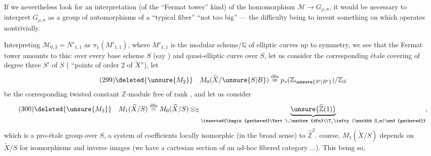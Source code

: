 If we nevertheless look for an interpretation (of the ``Fermat tower'' kind) of the homomorphism $\mathcal M\to G_{\rho,\sigma}$, it would be necessary to interpret $G_{\rho,\sigma}$  as a group of automorphisms of a ``typical fiber'' ``not too big'' --- the difficulty being to invent something on which  operates nontrivially.



Interpreting $\mathcal M_{0,3}=N'_{1,1}$ as $\pi_1(M'_{1,1})$, where $M'_{1,1}$ is the modular scheme/$\mathbb Q$ of elliptic curves up to symmetry, we see that the Fermat tower amounts to this: over every base scheme $S$ (say ) and  quasi-elliptic curve  over $S$, let us consider the corresponding étale covering of degree three $S'$ of $S$ ( ``points of order 2 of $\widetilde X$''),  let
\[
\tag{299}
\deleted{\unsure{M_2}}\quad M_0(\widetilde X/\unsure{S|B})\overset{\mathrm{dfn}}{=}p_*(\mathbb Z_{\unsure{S'|B'}})/\mathbb Z_S
\]
be the corresponding twisted constant $\mathbb Z$-module free of rank , and let us consider
\[
\tag{300}
\deleted{\unsure{M_2}}\quad M_1(\widetilde X/S)\overset{\mathrm{dfn}}{=}M_0(\widetilde X/S)\otimes_{\mathbb Z}\underbrace{\unsure{\widehat{\mathbb Z}(1)}}_{\inserted{\begin{gathered}\Vert\,\mathrm{dfn}\\T_\infty(\mathbb G_m)\end{gathered}}},
\]
which is a pro-étale group over $S$, a system of coefficients locally isomorphic (in the broad sense) to $\widehat{\mathbb Z}^{2}$.  course, $M_1(\widetilde X/S)$ depends  on $\widetilde X/S$ for isomorphisms and inverse images (we have a cartesian section of an ad-hoc fibered category $\ldots$). This being so,


